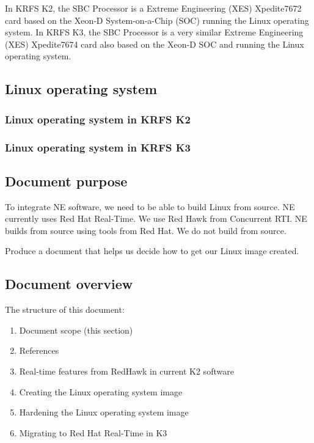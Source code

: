 \documentclass[12pt]{article}
\begin{document}
In KRFS K2, the SBC Processor is a Extreme Engineering (XES) Xpedite7672 card based on the Xeon-D
System-on-a-Chip (SOC) running the Linux operating system.
In KRFS K3, the SBC Processor is a very similar Extreme Engineering (XES) Xpedite7674 card also based on the Xeon-D SOC and running the Linux operating system.

\subsection{Linux operating system}

\subsubsection{Linux operating system in KRFS K2}

\subsubsection{Linux operating system in KRFS K3}


\subsection{Document purpose}
To integrate NE software, we need to be able to build Linux from source.  NE currently uses Red Hat Real-Time.  We use Red Hawk from Concurrent RTI.  NE builds from source using tools from Red Hat.  We do not build from source.

Produce a document that helps us decide how to get our Linux image created.


\subsection{Document overview}
The structure of this document:

\begin{enumerate}
    \item Document scope (this section)
    \item References
    \item Real-time features from RedHawk in current K2 software
    \item Creating the Linux operating system image
    \item Hardening the Linux operating system image
    \item Migrating to Red Hat Real-Time in K3
\end{enumerate}
\end{document}
